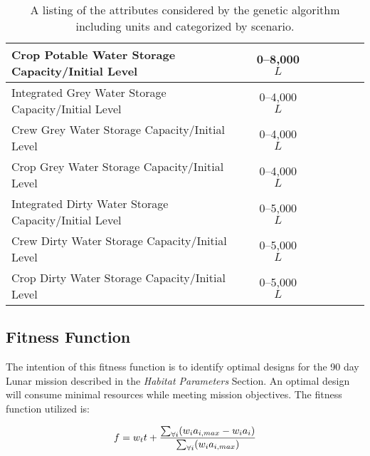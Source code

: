 \documentclass[submit]{aiaa}
\begin{document}
\begin{table}[htb]
\begin{tabular}{l c c c c c c}
	Crop Potable Water Storage Capacity/Initial Level & 0--8,000 $L$ & & & \checkmark & & \checkmark \\ \hline
	Integrated Grey Water Storage Capacity/Initial Level & 0--4,000 $L$ & \checkmark & \checkmark & & \checkmark \\
	Crew Grey Water Storage Capacity/Initial Level & 0--4,000 $L$ & & & \checkmark & & \checkmark \\
	Crop Grey Water Storage Capacity/Initial Level & 0--4,000 $L$ & & & \checkmark & & \checkmark \\ \hline
	Integrated Dirty Water Storage Capacity/Initial Level & 0--5,000 $L$ & \checkmark & \checkmark & & \checkmark \\
	Crew Dirty Water Storage Capacity/Initial Level & 0--5,000 $L$ & & & \checkmark & & \checkmark \\
	Crop Dirty Water Storage Capacity/Initial Level & 0--5,000 $L$ & & & \checkmark & & \checkmark \\ \hline
	\end{tabular}
	\caption{A listing of the attributes considered by the genetic algorithm including units and categorized by scenario.}
	\label{tab:attributes}
\end{table}

\subsection{Fitness Function}
\label{sec:fitness}

The intention of this fitness function is to identify optimal
designs for the 90 day Lunar mission described in the \emph{Habitat Parameters} Section.%
An optimal design will consume minimal
resources while meeting mission objectives. The fitness function
utilized is:

\[ f = w_tt + {{{\sum_{\forall i} (w_ia_{i,max} - w_ia_i)} \over {\sum_{\forall i}
(w_ia_{i,max})}}}  \]
\end{document}
